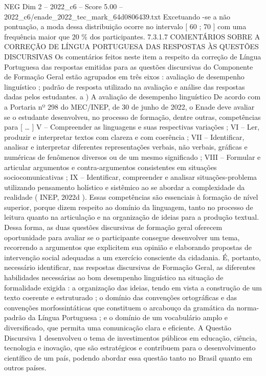 \begin{textsample}{NEG Dim 2 – 2022\_c6 – Score 5.00 – 2022\_c6/enade\_2022\_tec\_mark\_64d0806439.txt}
Excetuando -se a não pontuação, a moda dessa distribuição ocorre no intervalo [ 60 ; 70 ] com uma frequência maior que 20 \% dos participantes. 7.3.1.7 COMENTÁRIOS SOBRE A CORREÇÃO DE LÍNGUA PORTUGUESA DAS RESPOSTAS ÀS QUESTÕES DISCURSIVAS Os comentários feitos neste item a respeito da correção de Língua Portuguesa das respostas emitidas para as questões discursivas do Componente de Formação Geral estão agrupados em três eixos : avaliação de desempenho linguístico ; padrão de resposta utilizado na avaliação e análise das respostas dadas pelos estudantes. a ) A avaliação de desempenho linguístico De acordo com a Portaria nº 298 do MEC/INEP, de 30 de junho de 2022, o Enade deve avaliar se o estudante desenvolveu, no processo de formação, dentre outras, competências para [ … ] V – Compreender as linguagens e suas respectivas variações ; VI – Ler, produzir e interpretar textos com clareza e com coerência ; VII – Identificar, analisar e interpretar diferentes representações verbais, não verbais, gráficas e numéricas de fenômenos diversos ou de um mesmo significado ; VIII – Formular e articular argumentos e contra-argumentos consistentes em situações sociocomunicativas ; IX – Identificar, compreender e analisar situações-problema utilizando pensamento holístico e sistêmico ao se abordar a complexidade da realidade ( INEP, 2022d ).
Essas competências são essenciais à formação de nível superior, porque dizem respeito ao domínio da linguagem, tanto no processo de leitura quanto na articulação e na organização de ideias para a produção textual.
Dessa forma, as duas questões discursivas de formação geral oferecem oportunidade para avaliar se o participante consegue desenvolver um tema, recorrendo a argumentos que explicitem sua opinião e elaborando propostas de intervenção social adequadas a um exercício consciente da cidadania.
É, portanto, necessário identificar, nas respostas discursivas de Formação Geral, as diferentes habilidades necessárias ao bom desempenho linguístico na situação de formalidade exigida : a organização das ideias, tendo em vista a construção de um texto coerente e estruturado ; o domínio das convenções ortográficas e das convenções morfossintáticas que constituem o arcabouço da gramática da norma-padrão da Língua Portuguesa ; e o domínio de um vocabulário amplo e diversificado, que permita uma comunicação clara e eficiente.
A Questão Discursiva 1 desenvolveu o tema de investimentos públicos em educação, ciência, tecnologia e inovação, que são estratégicos e contribuem para o desenvolvimento científico de um país, podendo abordar essa questão tanto no Brasil quanto em outros países.

\end{textsample}
